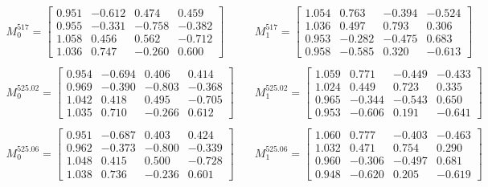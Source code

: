 \[
\begin{matrix}
M_0 ^{517} = \begin{bmatrix}
            0.951 & -0.612 & 0.474 & 0.459 \\
            0.955 & -0.331 & -0.758 & -0.382 \\
            1.058 & 0.456 & 0.562 & -0.712 \\
            1.036 & 0.747 & -0.260 & 0.600
            \end{bmatrix}
& \quad
M_1 ^{517} = \begin{bmatrix}
            1.054 & 0.763 & -0.394 & -0.524 \\
            1.036 & 0.497 & 0.793 & 0.306 \\
            0.953 & -0.282 & -0.475 & 0.683 \\
            0.958 & -0.585 & 0.320 & -0.613
            \end{bmatrix}
\\ \\
M _ 0 ^{525.02} = \begin{bmatrix}
    0.954 & -0.694 & 0.406 & 0.414 \\
    0.969 & -0.390 & -0.803 & -0.368 \\
    1.042 & 0.418 & 0.495 & -0.705 \\
    1.035 & 0.710 & -0.266 & 0.612
    \end{bmatrix}
& \quad
M _ 1 ^{525.02} = \begin{bmatrix}
    1.059 & 0.771 & -0.449 & -0.433 \\
    1.024 & 0.449 & 0.723 & 0.335 \\
    0.965 & -0.344 & -0.543 & 0.650 \\
    0.953 & -0.606 & 0.191 & -0.641
    \end{bmatrix}
\\ \\
M _ 0 ^{525.06} = \begin{bmatrix}
    0.951 & -0.687 & 0.403 & 0.424 \\
    0.962 & -0.373 & -0.800 & -0.339 \\
    1.048 & 0.415 & 0.500 & -0.728 \\
    1.038 & 0.736 & -0.236 & 0.601
    \end{bmatrix}
& \quad
M _ 1 ^{525.06} = \begin{bmatrix}
    1.060 & 0.777 & -0.403 & -0.463 \\
    1.032 & 0.471 & 0.754 & 0.290 \\
    0.960 & -0.306 & -0.497 & 0.681 \\
    0.948 & -0.620 & 0.205 & -0.619
    \end{bmatrix}
\end{matrix}
\]

